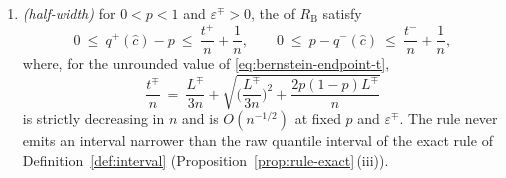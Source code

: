 \begin{proposition}
\begin{enumerate}[label=(\roman*),leftmargin=2.2em]
first rounded up to the fixed dyadic grid $2^{-s}\mathbb{Z}$, i.e.\ replaced
by $\lceil y\,2^{s}\rceil/2^{s}$ before the root is taken; the evaluation
takes $u$ from \eqref{eq:isqrt-bounds} applied to that grid point (with
$d=2^{s}$ fixed) at every step of Lemma~\ref{lem:log-enclosure}'s
iteration, rounds the square root in \eqref{eq:bernstein-endpoint-t} the
same way, and takes $L^{\mp}$ and $t^{\mp}$ themselves as the least
multiples of $2^{-s}$ at or above the values so obtained. Every such step
is a composition of non-decreasing maps, and every rounding is upward, so
(i) is unaffected;
\item \emph{(half-width)} for $0<p<1$ and $\varepsilon^{\mp}>0$, the
 of $R_{\mathrm{B}}$ satisfy
\begin{equation}\label{eq:bernstein-width}
  0\ \le\ q^{+}(\hat c)-p\ \le\ \frac{t^{+}}{n}+\frac1n,
  \qquad
  0\ \le\ p-q^{-}(\hat c)\ \le\ \frac{t^{-}}{n}+\frac1n,
\end{equation}
where, for the unrounded value of \eqref{eq:bernstein-endpoint-t},
\begin{equation}\label{eq:bernstein-halfwidth}
  \frac{t^{\mp}}{n}
  \ =\ \frac{L^{\mp}}{3n}+\sqrt{\Big(\frac{L^{\mp}}{3n}\Big)^{2}
        +\frac{2p(1-p)L^{\mp}}{n}}
\end{equation}
is strictly decreasing in $n$ and is $O(n^{-1/2})$ at fixed $p$ and
$\varepsilon^{\mp}$. The rule never emits an interval narrower than the raw
quantile interval of the exact rule of Definition~\ref{def:interval}
(Proposition~\ref{prop:rule-exact}\,(iii)).
\end{enumerate}
\end{proposition}

